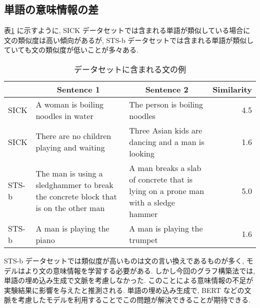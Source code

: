 \documentclass[a4j,twoside,12pt]{thesis} %
\begin{document}
\subsection{単語の意味情報の差}
表\ref{table:SICKSTS} に示すように, SICK データセットでは含まれる単語が類似している場合に文の類似度は高い傾向があるが, STS-b データセットでは含まれる単語が類似していても文の類似度が低いことが多々ある.
\begin{table}
  \caption{データセットに含まれる文の例}
  \label{table:SICKSTS}
  \begin{center}
  \begin{tabularx}{\linewidth}{l||X|X|r}
    \hline
          & \multicolumn{1}{c|}{Sentence 1} & \multicolumn{1}{c|}{Sentence 2} & \multicolumn{1}{c}{Similarity}  \\
    \hline
    \hline
    SICK &
    A woman is boiling noodles in water &
    The person is boiling noodles &
    4.5\\
    \hline
    SICK &
    There are no children playing and waiting &
    Three Asian kids are dancing and a man is looking &
    1.6\\
    \hline
    STS-b &
    The man is using a sledghammer to break the concrete block that is on the other man &
    A man breaks a slab of concrete that is lying on a prone man with a sledge hammer &
    5.0 \\
    \hline
    STS-b &
    A man is playing the piano &
    A man is playing the trumpet &
    1.6\\
    \hline
  \end{tabularx}
  \end{center}
\end{table}

STS-b データセットでは類似度が高いものは文の言い換えであるものが多く, モデルはより文の意味情報を学習する必要がある. しかし今回のグラフ構築法では, 単語の埋め込み生成で文脈を考慮しなかった. このことによる意味情報の不足が実験結果に影響を与えたと推測される. 単語の埋め込み生成で, BERT などの文脈を考慮したモデルを利用することでこの問題が解決できることが期待できる.
\end{document}
